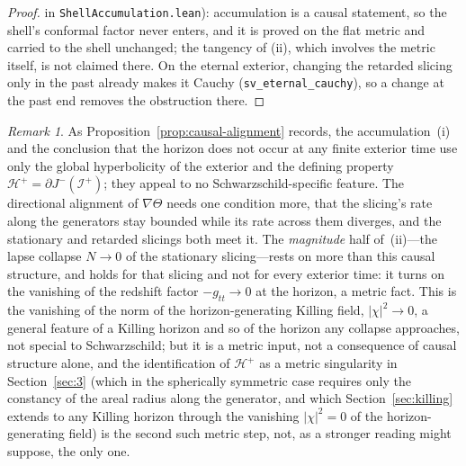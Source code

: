 \documentclass[11pt,a4paper]{article}
\theoremstyle{plain}
\theoremstyle{remark}
\newtheorem{remark}{Remark}
\begin{document}
\begin{proof}
in \texttt{ShellAccumulation.lean}): accumulation is a causal statement, so the shell's conformal factor never enters, and it is proved on the flat metric and carried to the shell unchanged; the tangency of (ii), which involves the metric itself, is not claimed there. On the eternal exterior, changing the retarded slicing only in the past already makes it Cauchy (\texttt{sv\_eternal\_cauchy}), so a change at the past end removes the obstruction there.
\end{proof}

\begin{remark}
As Proposition~\ref{prop:causal-alignment} records, the accumulation~(i) and the conclusion that the horizon does not occur at any finite exterior time use only the global hyperbolicity of the exterior and the defining property $\mathcal{H}^+=\partial J^-(\mathscr{I}^+)$; they appeal to no Schwarzschild-specific feature. The directional alignment of $\nabla\Theta$ needs one condition more, that the slicing's rate along the generators stay bounded while its rate across them diverges, and the stationary and retarded slicings both meet it. The \emph{magnitude} half of~(ii)---the lapse collapse $N\to0$ of the stationary slicing---rests on more than this causal structure, and holds for that slicing and not for every exterior time: it turns on the vanishing of the redshift factor $-g_{tt}\to0$ at the horizon, a metric fact. This is the vanishing of the norm of the horizon-generating Killing field, $|\chi|^{2}\to0$, a general feature of a Killing horizon and so of the horizon any collapse approaches, not special to Schwarzschild; but it is a metric input, not a consequence of causal structure alone, and the identification of $\mathcal{H}^+$ as a metric singularity in Section~\ref{sec:3} (which in the spherically symmetric case requires only the constancy of the areal radius along the generator, and which Section~\ref{sec:killing} extends to any Killing horizon through the vanishing $|\chi|^2=0$ of the horizon-generating field) is the second such metric step, not, as a stronger reading might suppose, the only one.
\end{remark}
\end{document}
